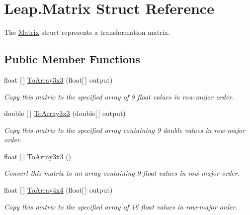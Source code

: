 \hypertarget{struct_leap_1_1_matrix}{}\section{Leap.\+Matrix Struct Reference}
\label{struct_leap_1_1_matrix}


The \mbox{\hyperlink{struct_leap_1_1_matrix}{Matrix}} struct represents a transformation matrix.  


\subsection*{Public Member Functions}
\begin{DoxyCompactItemize}
\item 
float \mbox{[}$\,$\mbox{]} \mbox{\hyperlink{struct_leap_1_1_matrix_a474eb2aa4ad08d234f7fc0242108ec0b}{To\+Array3x3}} (float\mbox{[}$\,$\mbox{]} output)
\begin{DoxyCompactList}\small\item\em Copy this matrix to the specified array of 9 float values in row-\/major order. \end{DoxyCompactList}\item 
double \mbox{[}$\,$\mbox{]} \mbox{\hyperlink{struct_leap_1_1_matrix_a5d9c2654aaaf9db5a9a2d7a89835d0c8}{To\+Array3x3}} (double\mbox{[}$\,$\mbox{]} output)
\begin{DoxyCompactList}\small\item\em Copy this matrix to the specified array containing 9 double values in row-\/major order. \end{DoxyCompactList}\item 
float \mbox{[}$\,$\mbox{]} \mbox{\hyperlink{struct_leap_1_1_matrix_a8eb2abbd6d9fe31e37b62db08271b004}{To\+Array3x3}} ()
\begin{DoxyCompactList}\small\item\em Convert this matrix to an array containing 9 float values in row-\/major order. \end{DoxyCompactList}\item 
float \mbox{[}$\,$\mbox{]} \mbox{\hyperlink{struct_leap_1_1_matrix_a6b6f2d1f0762dcde621566f9d189dd59}{To\+Array4x4}} (float\mbox{[}$\,$\mbox{]} output)
\begin{DoxyCompactList}\small\item\em Copy this matrix to the specified array of 16 float values in row-\/major order. \end{DoxyCompactList}\item 

\end{DoxyCompactItemize}
